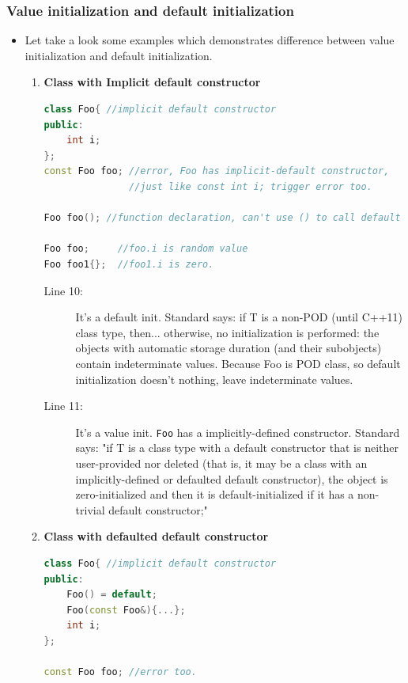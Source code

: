 \documentclass[a4paper,11pt,twoside]{book}
\begin{document}
\subsubsection{Value initialization and default initialization}
\begin{itemize}
 
	\item Let take a look some examples which demonstrates difference between value initialization and default initialization.
	\begin{enumerate}
		\item \textbf{Class with Implicit default constructor}
\begin{lstlisting}[frame=single, language=c++]
class Foo{ //implicit default constructor
public:
	int i;
};
const Foo foo; //error, Foo has implicit-default constructor, 
               //just like const int i; trigger error too.
				
Foo foo(); //function declaration, can't use () to call default ctor

Foo foo;     //foo.i is random value
Foo foo1{};	 //foo1.i is zero.		 
\end{lstlisting}

\begin{description}			
\item[Line 10:]	 It's a default init. Standard says: if T is a non-POD (until C++11) class type, then... otherwise, no initialization is performed: the objects with automatic storage duration (and their subobjects) contain indeterminate values. Because Foo is POD class, so default initialization doesn't nothing, leave indeterminate values.

\item[Line 11:]  It's a value init. \texttt{Foo} has a implicitly-defined constructor. Standard says: "if T is a class type with a default constructor that is neither user-provided nor deleted (that is, it may be a class with an implicitly-defined or defaulted default constructor), the object is zero-initialized and then it is default-initialized if it has a non-trivial default constructor;"
\end{description}

		\item \textbf{Class with defaulted default constructor}
\begin{lstlisting}[frame=single, language=c++]
class Foo{ //implicit default constructor
public:
	Foo() = default;
	Foo(const Foo&){...};
	int i;
};
	
const Foo foo; //error too.
	

\end{lstlisting}
\end{enumerate}
\end{itemize}
\end{document}
